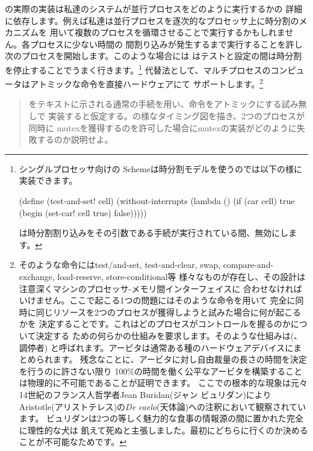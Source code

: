 の実際の実装は私達のシステムが並行プロセスをどのように実行するかの
詳細に依存します。例えば私達は並行プロセスを逐次的なプロセッサ上に時分割のメカニズムを
用いて複数のプロセスを循環させることで実行するかもしれません。各プロセスに少ない時間の
間割り込みが発生するまで実行することを許し次のプロセスを開始します。このような場合には
はテストと設定の間は時分割を停止することでうまく行きます。\footnote{
シングルプロセッサ向けの Schemeは時分割モデルを使うのでは以下の様に
実装できます。

\begin{smallscheme}
(define (test-and-set! cell)
  (without-interrupts
   (lambda ()
     (if (car cell)
         true
         (begin (set-car! cell true)
                false)))))
\end{smallscheme}

\noindent
{}は時分割割り込みをその引数である手続が実行されている間、無効にします。
}
代替法として、マルチプロセスのコンピュータはアトミックな命令を直接ハードウェアにて
サポートします。\footnote{そのような命令にはtest\-/and-set,
test-and-clear, swap, compare-and-exchange, load-reserve, store-conditional等
様々なものが存在し、その設計は注意深くマシンのプロセッサ-メモリ間インターフェイスに
合わせなければいけません。ここで起こる1つの問題にはそのような命令を用いて
完全に同時に同じリソースを2つのプロセスが獲得しようと試みた場合に何が起こるかを
決定することです。これはどのプロセスがコントロールを握るのかについて決定する
ための何らかの仕組みを要求します。そのような仕組みは(、調停者)
と呼ばれます。アービタは通常ある種のハードウェアデバイスにまとめられます。
残念なことに、アービタに対し自由裁量の長さの時間を決定を行うのに許さない限り
100\%の時間を働く公平なアービタを構築することは物理的に不可能であることが証明できます。
ここでの根本的な現象は元々14世紀のフランス人哲学者Jean Buridan(ジャン ビュリダン)により
Aristotle(アリストテレス)の\textit{De caelo}(天体論)への注釈において観察されています。
ビュリダンは2つの等しく魅力的な食事の情報源の間に置かれた完全に理性的な犬は
飢えて死ぬと主張しました。最初にどちらに行くのか決めることが不可能なためです。
}

\begin{quote}
をテキストに示される通常の手続を用い、命令をアトミックにする試み無しで
実装すると仮定する。の様なタイミング図を描き、2つのプロセスが同時に
mutexを獲得するのを許可した場合にmutexの実装がどのように失敗するのか説明せよ。
\end{quote}

